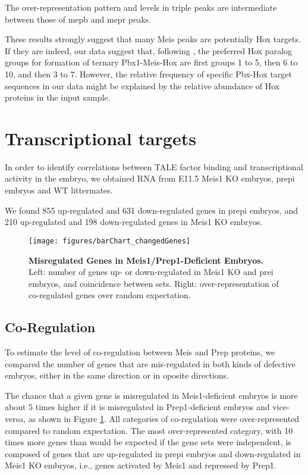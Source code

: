 The over-representation pattern and levels in triple peaks are intermediate between those of \ac{mepb} and \ac{mepr} peaks. 

These results strongly suggest that many Meis peaks are potentially Hox targets. If they are indeed, our data suggest that, following \cite{Shen1997}, the preferred Hox paralog groups for formation of ternary Pbx1-Meis-Hox are first groups 1 to 5, then 6 to 10, and then 3 to 7. However, the relative frequency of specific Pbx-Hox target sequences in our data might be explained by the relative abundance of Hox proteins in the input sample.


\section{Transcriptional targets}

In order to identify correlations between \ac{TALE} factor binding and transcriptional activity in the embryo, we obtained RNA from E11.5 Meis1 \ac{KO} embryos, \ac{prepi} embryos and \ac{WT} littermates. 

We found 855 up-regulated and 631 down-regulated genes in \ac{prepi} embryos, and 210 up-regulated and 198 down-regulated genes in Meis1 \ac{KO} embryos. 

\begin{figure}[]
  \centering
  \texttt{[image: figures/barChart\_changedGenes]}
  \caption[Misregulated Genes in Meis1/Prep1-Deficient Embryos]{\textbf{Misregulated Genes in Meis1/Prep1-Deficient Embryos.} Left: number of genes up- or down-regulated in Meis1 \ac{KO} and \ac{prei} embryos, and coincidence between sets. Right: over-representation of co-regulated genes over random expectation.}
  \label{fig:changedGenes}
\end{figure}

\subsection{Co-Regulation}

To estimate the level of co-regulation between Meis and Prep proteins, we compared the number of genes that are mis-regulated in both kinds of defective embryos, either in the same direction or in oposite directions. 

The chance that a given gene is misregulated in Meis1-deficient embryos is more about 5 times higher if it is misregulated in Prep1-deficient embryos and vice-versa, as shown in Figure \ref{fig:changedGenes}. All categories of co-regulation were over-represented compared to random expectation. The most over-represented category, with 10 times more genes than would be expected if the gene sets were independent, is composed of genes that are up-regulated in \ac{prepi} embryos and down-regulated in Meis1 \ac{KO} embryos, i.e., genes activated by Meis1 and repressed by Prep1.

